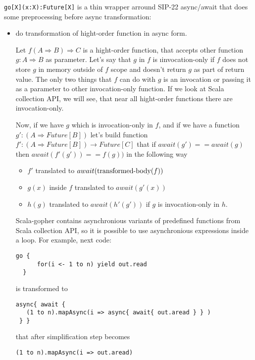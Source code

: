 \documentclass[12pt]{article}
\newcommand{\To}{\Rightarrow}
\begin{document}
 \verb|go[X](x:X):Future[X]| is a thin wrapper arround  SIP-22 async/await that does some preprocessing before async transformation:
\begin{itemize}
 \item do transformation of hight-order function in async form.


  Let $f(A \To B)\To C$ is a hight-order function, that accepts other function 
   $g:A \To B$ as parameter. 
  Let's say that $g$ in $f$ is {\i invocation-only } if $f$ does not store $g$ in memory outside of $f$ scope and doesn't return $g$ as part of return value. The only two things that $f$ can do with $g$ is an invocation or passing it as a parameter to other invocation-only function. If we look at Scala collection API, we will see, that near all hight-order functions there are invocation-only.

  Now, if we have $g$ which is invocation-only in $f$, and if we have a function $g' : (A \To Future[B])$ let's build function $f':(A\To Future[B])\to Future[C]$ that if $await(g')==await(g)$ then $await(f'(g'))==f(g))$ in the following way
  \begin{itemize}
    \item $f'$ translated to $await(\makebox{transformed-body}(f))$
    \item $g(x)$ inside $f$ translated to $await(g'(x))$
    \item $h(g)$ translated to $await(h'(g'))$ if $g$ is invocation-only in $h$.
  \end{itemize}

  Scala-gopher contains asynchronious variants of predefined functions from Scala collection API, so it is possible to use asynchronious expressions inside a loop. For example, next code:

\begin{Verbatim}[fontsize=\small]
  go { 
      for(i <- 1 to n) yield out.read
  }
\end{Verbatim}

  is transformed to

\begin{Verbatim}[fontsize=\small]
 async{ await {
   (1 to n).mapAsync(i => async{ await{ out.aread } } )
 } }
\end{Verbatim}

  that after simplification step becomes

\begin{Verbatim}[fontsize=\small]
   (1 to n).mapAsync(i => out.aread)
\end{Verbatim}


\end{itemize}
\end{document}
